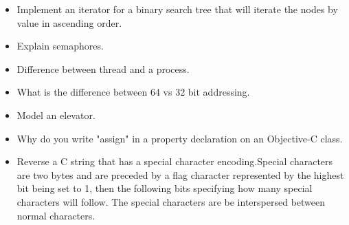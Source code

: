 \documentclass{article}
\begin{document}
\begin{itemize}
	\item Implement an iterator for a binary search tree that will iterate the nodes by value in ascending order.
	\item Explain semaphores.
	\item Difference between thread and a process.
	\item What is the difference between 64 vs 32 bit addressing.
	\item Model an elevator.
	\item Why do you write "assign" in a property declaration on an Objective-C class.
	\item Reverse a C string that has a special character encoding.Special characters are two bytes and are preceded by a flag character represented by the highest bit being set to 1, then the following bits specifying how many special characters will follow. The special characters are be interspersed between normal characters.  	
\end{itemize}
\end{document}
